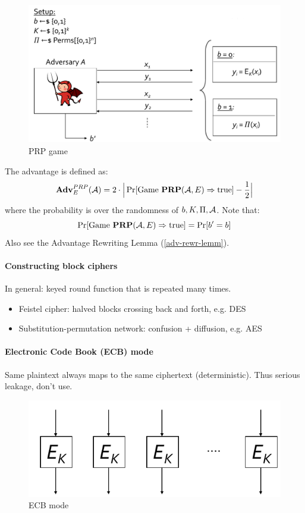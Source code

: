 \begin{figure}[h]
    \centering
	\includegraphics[scale=0.4]{images/prp.png}
    \caption{PRP game}
    \label{fig:prp}
\end{figure}

The advantage is defined as:
$$
\mathbf{Adv}^{PRP}_E (\mathcal{A})
= 2 \cdot \Big| \Pr[ \text{Game }\textbf{PRP}(\mathcal{A}, E) \Rightarrow \text{true} ] - \frac{1}{2} \Big|
$$
where the probability is over the randomness of $b, K, \Pi, \mathcal{A}$.
Note that:
$$
\Pr[ \text{Game }\textbf{PRP}(\mathcal{A}, E) \Rightarrow \text{true} ]
= \Pr[b'=b]
$$
Also see the Advantage Rewriting Lemma (\ref{adv-rewr-lemm}).

\paragraph{Constructing block ciphers}
In general: keyed round function that is repeated many times.

\begin{itemize}
\item Feistel cipher: halved blocks crossing back and forth, e.g. DES
\item Substitution-permutation network: confusion + diffusion, e.g. AES
\end{itemize}

\paragraph{Electronic Code Book (ECB) mode}
Same plaintext always maps to the same ciphertext (deterministic).
Thus serious leakage, don't use.

\begin{figure}[h]
    \centering
	\includegraphics[scale=0.4]{images/ecb.png}
    \caption{ECB mode}
    \label{fig:ecb}
\end{figure}

